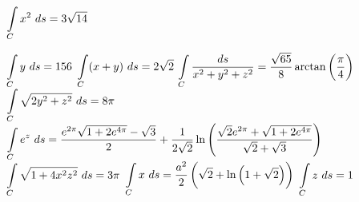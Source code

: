 \begin{Answer}
    
    \Question $\displaystyle \int\limits_C x^2 \ ds = 3 \sqrt{14}$
  
    \Question $\displaystyle \int\limits_C y \ ds = 156$
    \Question $\displaystyle \int\limits_C (x+y) \ ds = 2 \sqrt{2}$
    \Question $\displaystyle \int\limits_C \dfrac{ds}{x^2 + y^2 + z^2} = \dfrac{\sqrt{65}}{8} \arctan\left(\dfrac{\pi}{4} \right)$
    \Question $\displaystyle \int\limits_C \sqrt{2y^2 + z^2} \ ds = 8\pi$
    \Question $\displaystyle \int\limits_C e^z \ ds = \dfrac{e^{2\pi}\sqrt{1+2e^{4\pi}} - \sqrt{3}}{2} + \dfrac{1}{2\sqrt{2}} \ln \left( \dfrac{\sqrt{2}e^{2\pi}+\sqrt{1+2e^{4\pi}}}{\sqrt{2}+\sqrt{3}} \right)$
    \Question $\displaystyle \int\limits_C \sqrt{1+4x^2z^2} \ ds = 3 \pi$
    \Question $\displaystyle \int\limits_C x \ ds = \dfrac{a^2}{2} \left( \sqrt{2} + \ln \left( 1 + \sqrt{2} \right) \right)$
    \Question $\displaystyle \int\limits_C z \ ds = 1$ 
    
\end{Answer}
\pagebreak


